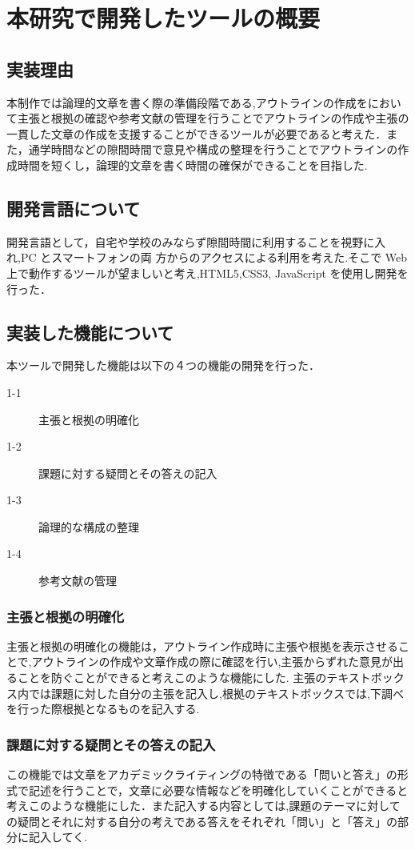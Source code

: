 \documentclass[a4j,12pt]{jarticle}
\begin{document}
\section{本研究で開発したツールの概要}
\subsection{実装理由}
本制作では論理的文章を書く際の準備段階である,アウトラインの作成をにおいて主張と根拠の確認や参考文献の管理を行うことでアウトラインの作成や主張の一貫した文章の作成を支援することができるツールが必要であると考えた．また，通学時間などの隙間時間で意見や構成の整理を行うことでアウトラインの作成時間を短くし，論理的文章を書く時間の確保ができることを目指した.

\subsection{開発言語について}
開発言語として，自宅や学校のみならず隙間時間に利用することを視野に入れ,PC とスマートフォンの両
方からのアクセスによる利用を考えた.そこで Web 上で動作するツールが望ましいと考え,HTML5,CSS3, JavaScript を使用し開発を行った．
\subsection{実装した機能について}
本ツールで開発した機能は以下の４つの機能の開発を行った．
\begin{description}
  \item[1-1] 主張と根拠の明確化
  \item[1-2] 課題に対する疑問とその答えの記入
  \item[1-3] 論理的な構成の整理
  \item[1-4] 参考文献の管理
 \end{description}

\subsubsection{主張と根拠の明確化}
主張と根拠の明確化の機能は，アウトライン作成時に主張や根拠を表示させることで,アウトラインの作成や文章作成の際に確認を行い,主張からずれた意見が出ることを防ぐことができると考えこのような機能にした.
主張のテキストボックス内では課題に対した自分の主張を記入し,根拠のテキストボックスでは,下調べを行った際根拠となるものを記入する.

\subsubsection{課題に対する疑問とその答えの記入}
この機能では文章をアカデミックライティングの特徴である「問いと答え」の形式で記述を行うことで，文章に必要な情報などを明確化していくことができると考えこのような機能にした．また記入する内容としては,課題のテーマに対しての疑問とそれに対する自分の考えである答えをそれぞれ「問い」と「答え」の部分に記入してく.
\end{document}

